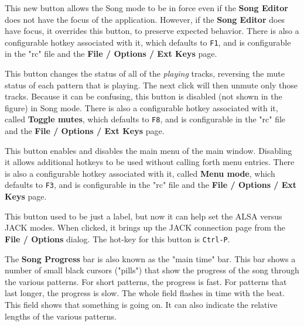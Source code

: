    \setcounter{ItemCounter}{0}      %

   This new button allows the Song mode to be in force even if
   the \textbf{Song Editor} does not have the focus of the application.
   However, if the \textbf{Song Editor} does have focus, it overrides this
   button, to preserve expected behavior.
   There is also a configurable hotkey associated with it,
   which defaults to \texttt{F1}, and is configurable in the "rc" file and
   the \textbf{File / Options / Ext Keys} page.

   This button changes the status of all of the
   \textsl{playing} tracks, reversing the
   mute status of each pattern that is playing.
   The next click will then unmute only those tracks.
   Because it can be confusing, this button is disabled (not shown
   in the figure) in Song mode.
   There is also a configurable hotkey associated with it, called
   \textbf{Toggle mutes},
   which defaults to \texttt{F8}, and is configurable in the "rc" file and
   the \textbf{File / Options / Ext Keys} page.

   This button enables and disables the main menu of the main window.
   Disabling it allows additional hotkeys to be used without calling forth menu
   entries.
   There is also a configurable hotkey associated with it, called
   \textbf{Menu mode},
   which defaults to \texttt{F3}, and is configurable in the "rc" file and
   the \textbf{File / Options / Ext Keys} page.

   This button used to be just a label, but now it can help set the ALSA versus
   JACK modes.  When clicked, it brings up the JACK connection page from the
   \textbf{File / Options} dialog.  The hot-key for this button
   is \texttt{Ctrl-P}.

   The \textbf{Song Progress} bar is also known as the "main time" bar.
   This bar shows a number of small black cursors ("pills") that show the
   progress of the song through the various patterns.  For short patterns,
   the progress is fast.  For patterns that last longer, the progress is
   slow.  The whole field flashes in time with the beat.
   This field shows that something is going on.  It can also indicate
   the relative lengths of the various patterns.

